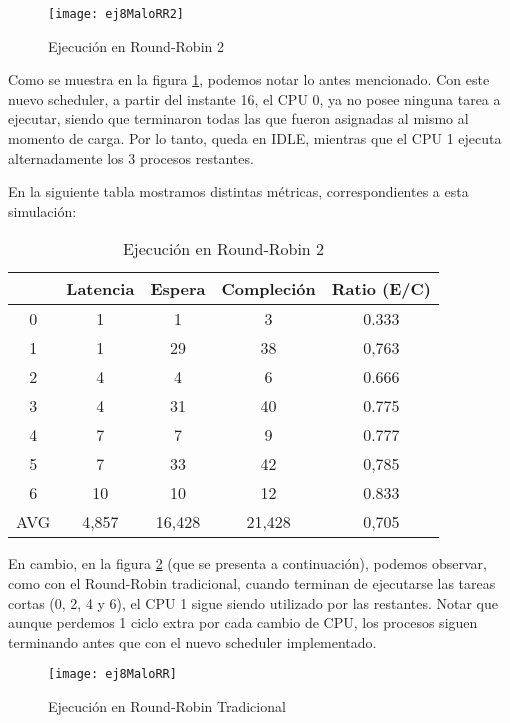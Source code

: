 \begin{figure}[h]
    \texttt{[image: ej8MaloRR2]}
    \caption{Ejecución en Round-Robin 2}
    \label{RR2Malo}
\end{figure}

Como se muestra en la figura \ref{RR2Malo}, podemos notar lo antes mencionado. Con este nuevo scheduler, a partir del instante 16, el CPU 0, ya no posee ninguna tarea a ejecutar, siendo que terminaron todas las que fueron asignadas al mismo al momento de carga. Por lo tanto, queda en IDLE, mientras que el CPU 1 ejecuta alternadamente los 3 procesos restantes.

En la siguiente tabla mostramos distintas métricas, correspondientes a esta simulación:
\begin{table}[h]
  \caption{Ejecución en Round-Robin 2}
  \centering
    \begin{tabular}{c c c c c}
    \hline
          & Latencia & Espera & Compleción & Ratio (E/C) \\
    \hline
        0 &     1    &    1   &      3     &     0.333   \\
        1 &     1    &   29   &     38     &     0,763   \\
        2 &     4    &    4   &      6     &     0.666   \\
        3 &     4    &   31   &     40     &     0.775   \\
        4 &     7    &    7   &      9     &     0.777   \\
        5 &     7    &   33   &     42     &     0,785   \\
        6 &     10   &   10   &     12     &     0.833   \\
        AVG & 4,857  & 16,428 &   21,428   &     0,705   \\
    \end{tabular}
\end{table}


En cambio, en la figura \ref{RRMalo} (que se presenta a continuación), podemos observar, como con el Round-Robin tradicional, cuando terminan de ejecutarse las tareas cortas (0, 2, 4 y 6), el CPU 1 sigue siendo utilizado por las restantes. Notar que aunque perdemos 1 ciclo extra por cada cambio de CPU, los procesos siguen terminando antes que con el nuevo scheduler implementado.

\begin{figure}[h]
    \texttt{[image: ej8MaloRR]}
    \caption{Ejecución en Round-Robin Tradicional}
    \label{RRMalo}
\end{figure}

